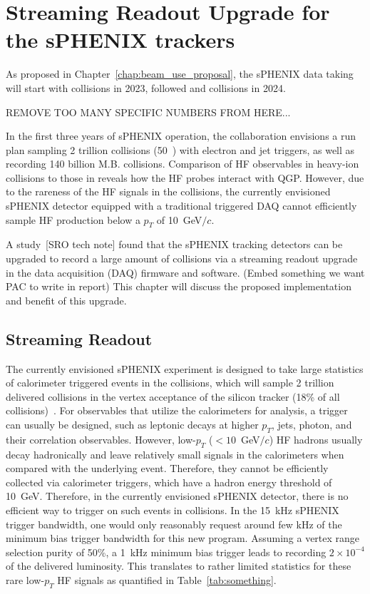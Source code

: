 
\section{Streaming Readout Upgrade for the sPHENIX trackers}
 
As proposed in Chapter~\ref{chap:beam_use_proposal}, the sPHENIX data taking will start with \auau collisions in 2023, followed \pp and \pau collisions in 2024.  

REMOVE TOO MANY SPECIFIC NUMBERS FROM HERE...

In the first three years of sPHENIX operation, the collaboration
envisions a run plan sampling 2 trillion \pp collisions (50~\pb) with
electron and jet triggers, as well as recording 140 billion M.B. \AuAu
collisions. Comparison of HF observables in heavy-ion collisions to
those in \pp reveals how the HF probes interact with QGP.  However,
due to the rareness of the HF signals in the \pp collisions, the
currently envisioned sPHENIX detector equipped with a traditional
triggered DAQ cannot efficiently sample HF production below a $p_T$ of
10~GeV$/c$.
 
A study~[SRO tech note] found that the sPHENIX tracking detectors can
be upgraded to record a large amount of \pp collisions via a streaming
readout upgrade in the data acquisition (DAQ) firmware and software.
(Embed something we want PAC to write in report) This chapter will
discuss the proposed implementation and benefit of this upgrade.

\subsection{Streaming Readout}
 
The currently envisioned sPHENIX experiment is designed to take large
statistics of calorimeter triggered events in the \pp collisions,
which will sample 2 trillion delivered \pp collisions in the vertex
acceptance of the silicon tracker (18\% of all
collisions)~\cite{something}. For observables that utilize the
calorimeters for analysis, a trigger can usually be designed, such as
leptonic decays at higher $p_T$, jets, photon, and their correlation
observables.  However, low-$p_T$ ($<10$~GeV$/c$) HF hadrons usually
decay hadronically and leave relatively small signals in the
calorimeters when compared with the underlying event. Therefore, they
cannot be efficiently collected via calorimeter triggers, which have a
hadron energy threshold of 10~GeV. Therefore, in the currently
envisioned sPHENIX detector, there is no efficient way to trigger on
such events in \pp collisions.  In the 15~kHz sPHENIX trigger
bandwidth, one would only reasonably request around few kHz of the
minimum bias \pp trigger bandwidth for this new program. Assuming a
vertex range selection purity of 50\%, a 1~kHz minimum bias trigger
leads to recording $2\times10^{-4}$ of the delivered luminosity. This
translates to rather limited statistics for these rare low-$p_T$ HF
signals as quantified in Table~\ref{tab:something}.
 
